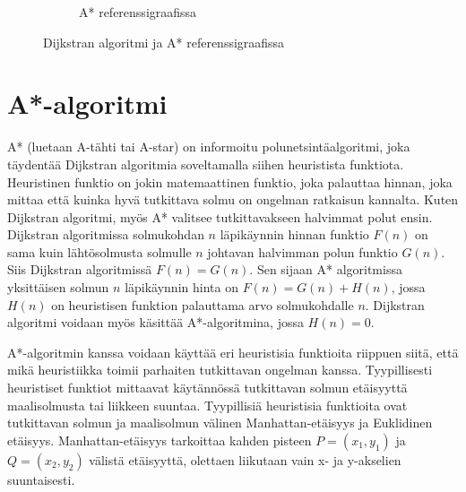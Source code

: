 \begin{figure}
\begin{subfigure}[b]{0.5\textwidth}
		\caption{A* referenssigraafissa}\label{refAStar}
	\end{subfigure}
	\caption{Dijkstran algoritmi ja A* referenssigraafissa}\label{DijkstraAStarFigs}
\end{figure}

\section{A*-algoritmi}\label{aStar}
A* (luetaan A-tähti tai A-star) on informoitu polunetsintäalgoritmi, joka 
täydentää Dijkstran algoritmia soveltamalla siihen heuristista 
funktiota.\cite{MathewAndMalathy} Heuristinen funktio on jokin matemaattinen 
funktio, joka palauttaa hinnan, joka mittaa että kuinka hyvä tutkittava 
solmu on ongelman ratkaisun kannalta. Kuten Dijkstran algoritmi, myös A* 
valitsee tutkittavakseen halvimmat polut ensin.\cite{DelaunayVoronoiAStar} 
Dijkstran algoritmissa solmukohdan $n$ läpikäynnin hinnan funktio 
$F(n)$ on sama kuin lähtösolmusta solmulle $n$ johtavan 
halvimman polun funktio $G(n)$. Siis Dijkstran algoritmissä 
$F(n) = G(n)$.\cite{MathewAndMalathy} Sen sijaan A* algoritmissa 
yksittäisen solmun $n$ läpikäynnin hinta on $F(n) = G(n) + H(n)$, jossa $H(n)$ 
on heuristisen funktion palauttama arvo solmukohdalle $n$.
\cite{DelaunayVoronoiAStar} Dijkstran algoritmi voidaan myös käsittää 
A*-algoritmina, jossa $H(n) = 0$.\cite{MathewAndMalathy}\par 
	A*-algoritmin kanssa voidaan käyttää eri heuristisia funktioita 
riippuen siitä, että mikä heuristiikka toimii parhaiten tutkittavan ongelman 
kanssa. Tyypillisesti heuristiset funktiot mittaavat käytännössä tutkittavan 
solmun etäisyyttä maalisolmusta tai liikkeen suuntaa.\cite{ProcediaAStar} 
Tyypillisiä heuristisia funktioita ovat tutkittavan solmun ja maalisolmun 
välinen Manhattan-etäisyys ja Euklidinen etäisyys.\cite{MathewAndMalathy} 
Manhattan-etäisyys tarkoittaa kahden pisteen $P = (x_1,y_1)$ ja 
$Q = (x_2,y_2)$ välistä etäisyyttä, olettaen liikutaan vain x- ja 
y-akselien suuntaisesti.\cite{MathewAndMalathy}

